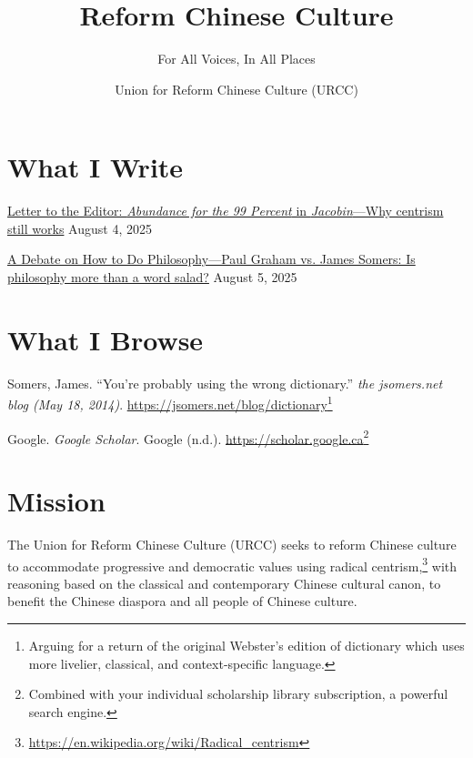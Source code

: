 \documentclass[12pt]{article}
\begin{document}
\title{Reform Chinese Culture}
\subtitle{For All Voices, In All Places}
\author{Union for Reform Chinese Culture (URCC)}

\maketitle

\section{What I Write}

\href{202508Abundance.html}{Letter to the Editor: \textit{Abundance for the 99 Percent} in \textit{Jacobin}---Why centrism still works} August 4, 2025

\href{202508DebateOnPhilosophyPaulGrahamPG.html}{A Debate on How to Do
Philosophy---Paul Graham vs. James Somers: Is philosophy more than a word salad?} August 5, 2025

\section{What I Browse}

Somers, James. \enquote{You're probably using the wrong dictionary.} \emph{the jsomers.net blog (May 18, 2014)}. \href{https://jsomers.net/blog/dictionary}{https://jsomers.net/blog/dictionary}\footnote{Arguing for a return of the original Webster's edition of dictionary which uses more livelier, classical, and context-specific language.}

Google. \emph{Google Scholar}. Google (n.d.). \href{https://scholar.google.ca}{https://scholar.google.ca}\footnote{Combined with your individual scholarship library subscription, a powerful search engine.}

\section{Mission}

The Union for Reform Chinese Culture (URCC) seeks to reform Chinese culture to accommodate progressive and democratic values using radical centrism,\footnote{\href{https://en.wikipedia.org/wiki/Radical\_centrism}{https://en.wikipedia.org/wiki/Radical\_centrism}} with reasoning based on the classical and contemporary Chinese cultural canon, to benefit the Chinese diaspora and all people of Chinese culture.

\end{document}
